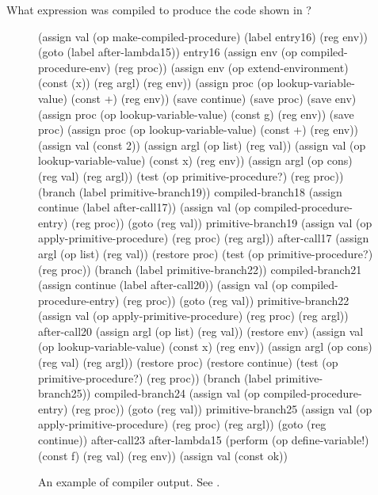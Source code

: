 \begin{exercise}
	\label{Exercise 5.35}
	What expression was compiled to produce the code shown in ?
\end{exercise}



\begin{figure}
	\begin{smallscheme}
	  (assign val
	          (op make-compiled-procedure)
	          (label entry16)
	          (reg env))
	    (goto (label after-lambda15))
	  entry16
	    (assign env (op compiled-procedure-env) (reg proc))
	    (assign env
	            (op extend-environment)
	            (const (x))
	            (reg argl)
	            (reg env))
	    (assign proc
	            (op lookup-variable-value)
	            (const +)
	            (reg env))
	    (save continue)
	    (save proc)
	    (save env)
	    (assign proc
	            (op lookup-variable-value)
	            (const g)
	            (reg env))
	    (save proc)
	    (assign proc
	            (op lookup-variable-value)
	            (const +)
	            (reg env))
	    (assign val (const 2))
	    (assign argl (op list) (reg val))
	    (assign val
	            (op lookup-variable-value)
	            (const x)
	            (reg env))
	    (assign argl (op cons) (reg val) (reg argl))
	    (test (op primitive-procedure?) (reg proc))
	    (branch (label primitive-branch19))
	  compiled-branch18
	    (assign continue (label after-call17))
	    (assign val (op compiled-procedure-entry) (reg proc))
	    (goto (reg val))
	  primitive-branch19
	    (assign val
	            (op apply-primitive-procedure)
	            (reg proc)
	            (reg argl))
	  after-call17
	    (assign argl (op list) (reg val))
	    (restore proc)
	    (test (op primitive-procedure?) (reg proc))
	    (branch (label primitive-branch22))
	  compiled-branch21
	    (assign continue (label after-call20))
	    (assign val (op compiled-procedure-entry) (reg proc))
	    (goto (reg val))
	  primitive-branch22
	    (assign val
	            (op apply-primitive-procedure)
	            (reg proc)
	            (reg argl))
	  after-call20
	    (assign argl (op list) (reg val))
	    (restore env)
	    (assign val
	            (op lookup-variable-value)
	            (const x)
	            (reg env))
	    (assign argl (op cons) (reg val) (reg argl))
	    (restore proc)
	    (restore continue)
	    (test (op primitive-procedure?) (reg proc))
	    (branch (label primitive-branch25))
	  compiled-branch24
	    (assign val
	            (op compiled-procedure-entry)
	            (reg proc))
	    (goto (reg val))
	  primitive-branch25
	    (assign val
	            (op apply-primitive-procedure)
	            (reg proc)
	            (reg argl))
	    (goto (reg continue))
	  after-call23
	  after-lambda15
	    (perform (op define-variable!)
	             (const f)
	             (reg val)
	             (reg env))
	    (assign val (const ok))
	\end{smallscheme}
	\caption{
		An example of compiler output.
		See .
	}
	\label{Figure 5.18}
\end{figure}



